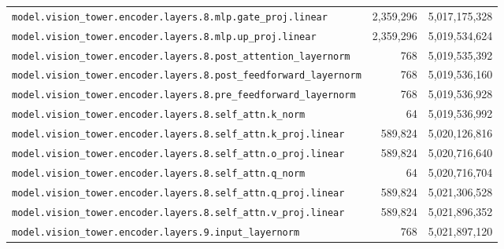 \documentclass[10pt,a4paper]{article}
\theoremstyle{definition}
\begin{document}
\begin{appendices}
\begin{longtable}{p{9.5cm}rr}
\texttt{model.\allowbreak{}vision\_tower.\allowbreak{}encoder.\allowbreak{}layers.\allowbreak{}8.\allowbreak{}mlp.\allowbreak{}gate\_proj.\allowbreak{}linear} & 2,359,296 & 5,017,175,328 \\
\texttt{model.\allowbreak{}vision\_tower.\allowbreak{}encoder.\allowbreak{}layers.\allowbreak{}8.\allowbreak{}mlp.\allowbreak{}up\_proj.\allowbreak{}linear} & 2,359,296 & 5,019,534,624 \\
\texttt{model.\allowbreak{}vision\_tower.\allowbreak{}encoder.\allowbreak{}layers.\allowbreak{}8.\allowbreak{}post\_attention\_layernorm} & 768 & 5,019,535,392 \\
\texttt{model.\allowbreak{}vision\_tower.\allowbreak{}encoder.\allowbreak{}layers.\allowbreak{}8.\allowbreak{}post\_feedforward\_layernorm} & 768 & 5,019,536,160 \\
\texttt{model.\allowbreak{}vision\_tower.\allowbreak{}encoder.\allowbreak{}layers.\allowbreak{}8.\allowbreak{}pre\_feedforward\_layernorm} & 768 & 5,019,536,928 \\
\texttt{model.\allowbreak{}vision\_tower.\allowbreak{}encoder.\allowbreak{}layers.\allowbreak{}8.\allowbreak{}self\_attn.\allowbreak{}k\_norm} & 64 & 5,019,536,992 \\
\texttt{model.\allowbreak{}vision\_tower.\allowbreak{}encoder.\allowbreak{}layers.\allowbreak{}8.\allowbreak{}self\_attn.\allowbreak{}k\_proj.\allowbreak{}linear} & 589,824 & 5,020,126,816 \\
\texttt{model.\allowbreak{}vision\_tower.\allowbreak{}encoder.\allowbreak{}layers.\allowbreak{}8.\allowbreak{}self\_attn.\allowbreak{}o\_proj.\allowbreak{}linear} & 589,824 & 5,020,716,640 \\
\texttt{model.\allowbreak{}vision\_tower.\allowbreak{}encoder.\allowbreak{}layers.\allowbreak{}8.\allowbreak{}self\_attn.\allowbreak{}q\_norm} & 64 & 5,020,716,704 \\
\texttt{model.\allowbreak{}vision\_tower.\allowbreak{}encoder.\allowbreak{}layers.\allowbreak{}8.\allowbreak{}self\_attn.\allowbreak{}q\_proj.\allowbreak{}linear} & 589,824 & 5,021,306,528 \\
\texttt{model.\allowbreak{}vision\_tower.\allowbreak{}encoder.\allowbreak{}layers.\allowbreak{}8.\allowbreak{}self\_attn.\allowbreak{}v\_proj.\allowbreak{}linear} & 589,824 & 5,021,896,352 \\
\texttt{model.\allowbreak{}vision\_tower.\allowbreak{}encoder.\allowbreak{}layers.\allowbreak{}9.\allowbreak{}input\_layernorm} & 768 & 5,021,897,120 \\

\end{longtable}
\end{appendices}
\end{document}
